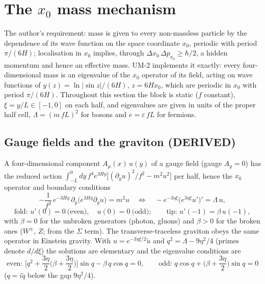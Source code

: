 \documentclass[
  10pt,
]{article}
\begin{document}
\hypertarget{the-x_0-mass-mechanism}{%
\section{\texorpdfstring{The \(x_0\) mass
mechanism}{The x\_0 mass mechanism}}\label{the-x_0-mass-mechanism}}

The author's requirement: mass is given to every non-massless particle
by the dependence of its wave function on the space coordinate \(x_0\),
periodic with period \(\pi/(6H)\); localisation in \(x_0\) implies,
through \(\Delta x_0\,\Delta p_{x_0} \ge \hbar/2\), a hidden momentum
and hence an effective mass. UM-2 implements it exactly: every
four-dimensional mass is an eigenvalue of the \(x_0\) operator of its
field, acting on wave functions of \(y(z) = \ln|\sin z|/(6H)\),
\(z = 6Hx_0\), which are periodic in \(x_0\) with period \(\pi/(6H)\).
Throughout this section the block is static (\(f\) constant),
\(\xi = y/L \in [-1, 0]\) on each half, and eigenvalues are given in
units of the proper half cell, \(\Lambda = (m\,fL)^2\) for bosons and
\(e = \varepsilon\, fL\) for fermions.

\hypertarget{gauge-fields-and-the-graviton-derived}{%
\subsection{Gauge fields and the graviton
(DERIVED)}\label{gauge-fields-and-the-graviton-derived}}

A four-dimensional component \(A_\mu(x)\,u(y)\) of a gauge field (gauge
\(A_y = 0\)) has the reduced action
\(\int_{-L}^{0}dy\,f^4e^{3Hy}\big[(\partial_yu)^2/f^2 - m^2u^2\big]\)
per half, hence the \(x_0\) operator and boundary conditions
\[ -\frac{1}{f^2}\,e^{-3Hy}\,\partial_y\big(e^{3Hy}\partial_yu\big) = m^2u
   \quad\Longleftrightarrow\quad -e^{-3\eta\xi}\big(e^{3\eta\xi}u'\big)' = \Lambda\,u ,\]
\[ \text{fold: } u'(0) = 0\ \text{(even)},\quad u(0) = 0\ \text{(odd)};\qquad \text{tip: } u'(-1) = \beta\,u(-1), \]
with \(\beta = 0\) for the unbroken generators (photon, gluons) and
\(\beta > 0\) for the broken ones (\(W^\pm\), \(Z\); from the \(\Sigma\)
term). The transverse-traceless graviton obeys the same operator in
Einstein gravity. With \(u = e^{-3\eta\xi/2}\tilde u\) and
\(q^2 = \Lambda - 9\eta^2/4\) (primes denote \(d/d\xi\)) the solutions
are elementary and the eigenvalue conditions are
\[ \text{even: } \Big[q^2 + \frac{3\eta}{2}\Big(\beta + \frac{3\eta}{2}\Big)\Big]\sin q - \beta\,q\cos q = 0,\qquad
   \text{odd: } q\cos q + \Big(\beta + \frac{3\eta}{2}\Big)\sin q = 0 \]
(\(q = i\tilde q\) below the gap \(9\eta^2/4\)).
\end{document}
